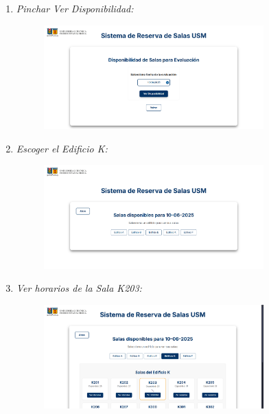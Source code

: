 \documentclass{article}
\begin{document}
\begin{enumerate}
\begin{enumerate}
            \item  \textit{Pinchar Ver Disponibilidad:}
            \begin{figure}[H] 
                \centering 
                \includegraphics[width=0.8\textwidth]{IMG/ss17.png} 
            \end{figure}
            
            \newpage
            \item \textit{Escoger el Edificio K:}
            \begin{figure}[H] 
                \centering 
                \includegraphics[width=0.8\textwidth]{IMG/ss18.png}
            \end{figure}
            

            \item  \textit{Ver horarios de la Sala K203:}
            \begin{figure}[H] 
                \centering 
                \includegraphics[width=0.8\textwidth]{IMG/ss19.png} 
            \end{figure}


\end{enumerate}
\end{enumerate}
\end{document}
